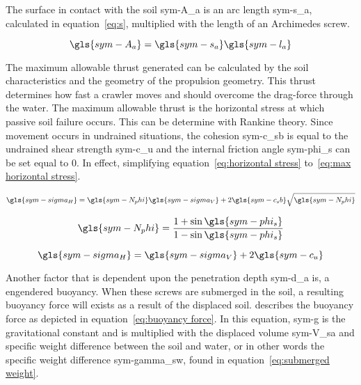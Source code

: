 \noindent The surface in contact with the soil \gls{sym-A_a} is an arc length \gls{sym-s_a}, calculated in
equation~\ref{eq:s}, multiplied with the length of an Archimedes screw.

\begin{equation}
    \label{eq:contact surface}
    \gls{sym-A_a}  = \gls{sym-s_a} \gls{sym-l_a}
\end{equation}

The maximum allowable thrust generated can be calculated by the soil characteristics and the geometry of the 
propulsion geometry. This thrust determines how fast a crawler moves and should overcome the drag-force through the 
water. The maximum allowable thrust is the horizontal stress at which passive soil failure occurs. This can be 
determine with Rankine theory. Since movement occurs in undrained situations, the cohesion \gls{sym-c_sb} is equal to
the undrained shear strength \gls{sym-c_u} and the internal friction angle \gls{sym-phi_s} can be set equal to \( 0 
\). In effect, simplifying equation~\ref{eq:horizontal stress} to~\ref{eq:max horizontal stress}.

\begin{equation}
    \label{eq:horizontal stress}
    \gls{sym-sigma_H} = \gls{sym-N_phi} \gls{sym-sigma_V} + 2\gls{sym-c_sb}\sqrt{\gls{sym-N_phi}}
\end{equation}

\begin{equation}
    \gls{sym-N_phi} = \frac{1 + \sin \gls{sym-phi_s}}{1 - \sin \gls{sym-phi_s}}
\end{equation}

\begin{equation}
    \label{eq:max horizontal stress}
    \gls{sym-sigma_H} = \gls{sym-sigma_V} + 2\gls{sym-c_u}
\end{equation}

Another factor that is dependent upon the penetration depth \gls{sym-d_a} is, a engendered buoyancy. When these 
screws are submerged in the soil, a resulting buoyancy force will exists as a result of the displaced soil. 
\citet{lotman_applicable_2009} describes the buoyancy force as depicted in equation~\ref{eq:buoyancy force}. In this 
equation, \gls{sym-g} is the gravitational constant and is multiplied with the displaced volume \gls{sym-V_sa} and 
specific weight difference between the soil and water, or in other words the specific weight difference  
\gls{sym-gamma_sw}, found in equation~\ref{eq:submerged weight}.

